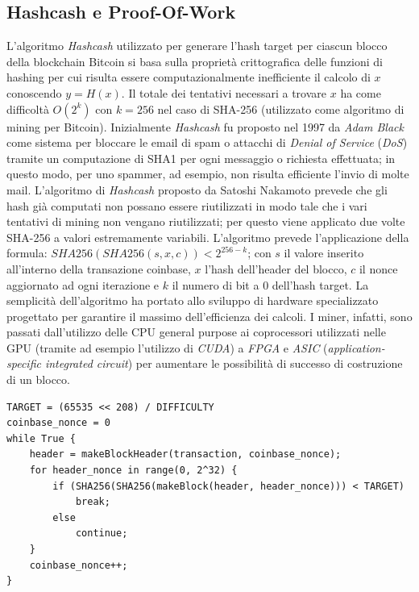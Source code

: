 \subsection{Hashcash e Proof-Of-Work}
L'algoritmo \textit{Hashcash} utilizzato per generare l'hash target per ciascun blocco della blockchain Bitcoin si basa sulla proprietà crittografica delle funzioni di hashing per cui risulta essere computazionalmente inefficiente il calcolo di $x$ conoscendo $y=H(x)$. Il totale dei tentativi necessari a trovare $x$ ha come difficoltà $O(2^k)$ con $k=256$ nel caso di SHA-256 (utilizzato come algoritmo di mining per Bitcoin).\newline
Inizialmente \textit{Hashcash} fu proposto nel 1997 da \textit{Adam Black} come sistema per bloccare le email di spam o attacchi di \textit{Denial of Service} (\textit{DoS}) tramite un computazione di SHA1 per ogni messaggio o richiesta effettuata; in questo modo, per uno spammer, ad esempio, non risulta efficiente l'invio di molte mail.\newline
L'algoritmo di \textit{Hashcash} proposto da Satoshi Nakamoto prevede che gli hash già computati non possano essere riutilizzati in modo tale che i vari tentativi di mining non vengano riutilizzati; per questo viene applicato due volte SHA-256 a valori estremamente variabili. L'algoritmo prevede l'applicazione della formula: $SHA256(SHA256(s,x,c))<2^{256-k}$; con $s$ il valore inserito all'interno della transazione coinbase, $x$ l'hash dell'header del blocco, $c$ il nonce aggiornato ad ogni iterazione e $k$ il numero di bit a $0$ dell'hash target.\newline
La semplicità dell'algoritmo ha portato allo sviluppo di hardware specializzato progettato per garantire il massimo dell'efficienza dei calcoli. I miner, infatti, sono passati dall'utilizzo delle CPU general purpose ai coprocessori utilizzati nelle GPU (tramite ad esempio l'utilizzo di \textit{CUDA}) a \textit{FPGA} e \textit{ASIC} (\textit{application-specific integrated circuit}) per aumentare le possibilità di successo di costruzione di un blocco.\newline
\begin{lstlisting}[caption=Pseudocodice dell'algoritmo di mining per Hashcash]
TARGET = (65535 << 208) / DIFFICULTY
coinbase_nonce = 0
while True {
    header = makeBlockHeader(transaction, coinbase_nonce);
    for header_nonce in range(0, 2^32) {
        if (SHA256(SHA256(makeBlock(header, header_nonce))) < TARGET)
            break;
        else
            continue;
    }
    coinbase_nonce++;
}
\end{lstlisting}
